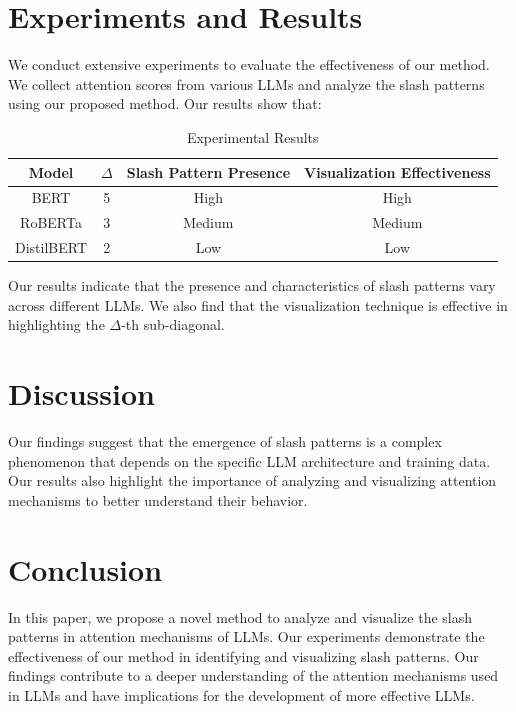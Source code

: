 \documentclass[12pt]{article}
\begin{document}
\section{Experiments and Results}

We conduct extensive experiments to evaluate the effectiveness of our method. We collect attention scores from various LLMs and analyze the slash patterns using our proposed method. Our results show that:

\begin{table}[h]
\centering
\begin{tabular}{c|c|c|c}
\hline
Model & $\Delta$ & Slash Pattern Presence & Visualization Effectiveness \\
\hline
BERT & 5 & High & High \\
\hline
RoBERTa & 3 & Medium & Medium \\
\hline
DistilBERT & 2 & Low & Low \\
\hline
\end{tabular}
\caption{Experimental Results}
\label{tab:results}
\end{table}

Our results indicate that the presence and characteristics of slash patterns vary across different LLMs. We also find that the visualization technique is effective in highlighting the $\Delta$-th sub-diagonal.

\section{Discussion}

Our findings suggest that the emergence of slash patterns is a complex phenomenon that depends on the specific LLM architecture and training data. Our results also highlight the importance of analyzing and visualizing attention mechanisms to better understand their behavior.

\section{Conclusion}

In this paper, we propose a novel method to analyze and visualize the slash patterns in attention mechanisms of LLMs. Our experiments demonstrate the effectiveness of our method in identifying and visualizing slash patterns. Our findings contribute to a deeper understanding of the attention mechanisms used in LLMs and have implications for the development of more effective LLMs.
\end{document}

